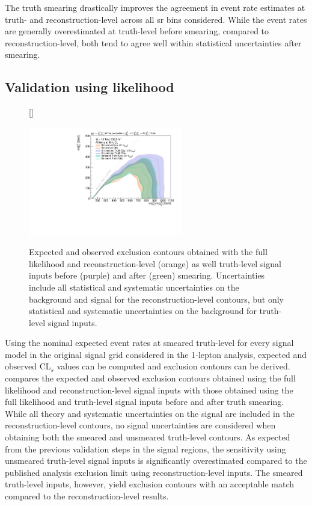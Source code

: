 The truth smearing drastically improves the agreement in event rate estimates at truth- and reconstruction-level across all \gls{sr} bins considered. While the event rates are generally overestimated at truth-level before smearing, compared to reconstruction-level, both tend to agree well within statistical uncertainties after smearing. 
 
\subsection{Validation using likelihood}

\begin{figure}
[\FBwidth]
{\caption{Expected and observed exclusion contours obtained with the full likelihood and reconstruction-level (orange) as well truth-level signal inputs before (purple) and after (green) smearing. Uncertainties include all statistical and systematic uncertainties on the background and signal for the reconstruction-level contours, but only statistical and systematic uncertainties on the background for truth-level signal inputs.}\label{fig:full_truth_result}}
{\includegraphics[width=0.60\textwidth]{exclusion_1Lbb_truthInput_compareReco_BkgOnly_noLabel}}
\end{figure}

Using the nominal expected event rates at smeared truth-level for every signal model in the original signal grid considered in the 1-lepton analysis, expected and observed CL$_s$ values can be computed and exclusion contours can be derived.  compares the expected and observed exclusion contours obtained using the full likelihood and reconstruction-level signal inputs with those obtained using the full likelihood and truth-level signal inputs before and after truth smearing. While all theory and systematic uncertainties on the signal are included in the reconstruction-level contours, no signal uncertainties are considered when obtaining both the smeared and unsmeared truth-level contours. As expected from the previous validation steps in the signal regions, the sensitivity using unsmeared truth-level signal inputs is significantly overestimated compared to the published analysis exclusion limit using reconstruction-level inputs. The smeared truth-level inputs, however, yield exclusion contours with an acceptable match compared to the reconstruction-level results.

